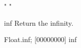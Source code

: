 \begin{urbiscriptapi}
\begin{urbiassert}
"%
"%
\end{urbiassert}

\item[inf]
  Return the infinity.
\begin{urbiscript}
Float.inf;
[00000000] inf
\end{urbiscript}


\end{urbiscriptapi}
